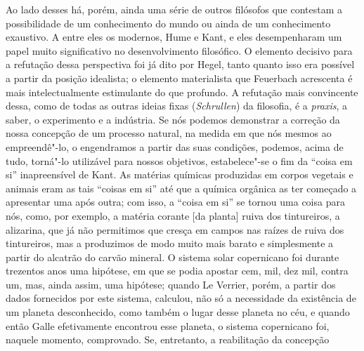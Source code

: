 Ao lado desses há, porém, ainda uma série de outros filósofos que
contestam a possibilidade de um conhecimento do mundo ou ainda de um
conhecimento exaustivo. A entre eles os
modernos, Hume e Kant,
e eles desempenharam um papel muito significativo no desenvolvimento
filosófico. O elemento decisivo para a refutação dessa perspectiva foi
já dito
por Hegel,
tanto quanto isso era possível a partir da posição idealista; o elemento
materialista
que Feuerbach acrescenta
é mais intelectualmente estimulante do que profundo. A refutação mais
convincente dessa, como de todas as outras ideias fixas
(\emph{Schrullen}) da filosofia, é a \emph{praxis}, a saber, o
experimento e a indústria. Se nós podemos demonstrar a correção da nossa
concepção de um processo natural, na medida em que nós mesmos ao
empreendê"-lo, o engendramos a partir das suas condições, podemos, acima
de tudo, torná"-lo utilizável para nossos objetivos, estabelece"-se o fim
da ``coisa em si'' inapreensível
de Kant.
As matérias químicas produzidas em corpos vegetais e animais eram as
tais ``coisas em si'' até que a química orgânica as ter começado a
apresentar uma após outra; com isso, a ``coisa em si'' se tornou uma
coisa para nós, como, por exemplo, a matéria corante {[}da planta{]}
ruiva dos tintureiros, a alizarina, que já não permitimos que cresça em
campos nas raízes de ruiva dos tintureiros, mas a produzimos de modo
muito mais barato e simplesmente a partir do alcatrão do carvão mineral.
O sistema solar copernicano foi durante trezentos anos uma hipótese, em
que se podia apostar cem, mil, dez mil, contra um, mas, ainda assim, uma
hipótese; quando Le Verrier, porém, a partir dos dados fornecidos por
este sistema, calculou, não só a necessidade da existência de um planeta
desconhecido, como também o lugar desse planeta no céu, e quando então
Galle efetivamente encontrou esse planeta,
o sistema copernicano foi, naquele momento, comprovado. Se, entretanto, a reabilitação da concepção
